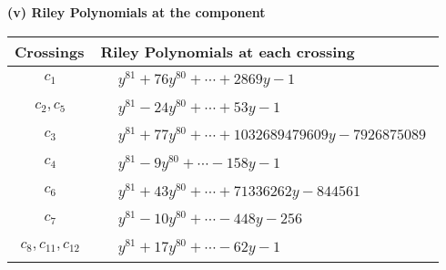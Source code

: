 \documentclass[1p]{elsarticle_modified}
\theoremstyle{definition}
\begin{document}
\newpage\renewcommand{\arraystretch}{1}
\flushleft \textbf{(v) Riley Polynomials at the component}\newline \\
\begin{tabular}{m{50pt}|m{274pt}}
Crossings & \hspace{64pt}Riley Polynomials at each crossing \\
\hline $$\begin{aligned}c_{1}\end{aligned}$$&$\begin{aligned}
&y^{81}+76 y^{80}+\cdots+2869 y-1
\end{aligned}$\\
\hline $$\begin{aligned}c_{2},c_{5}\end{aligned}$$&$\begin{aligned}
&y^{81}-24 y^{80}+\cdots+53 y-1
\end{aligned}$\\
\hline $$\begin{aligned}c_{3}\end{aligned}$$&$\begin{aligned}
&y^{81}+77 y^{80}+\cdots+1032689479609 y-7926875089
\end{aligned}$\\
\hline $$\begin{aligned}c_{4}\end{aligned}$$&$\begin{aligned}
&y^{81}-9 y^{80}+\cdots-158 y-1
\end{aligned}$\\
\hline $$\begin{aligned}c_{6}\end{aligned}$$&$\begin{aligned}
&y^{81}+43 y^{80}+\cdots+71336262 y-844561
\end{aligned}$\\
\hline $$\begin{aligned}c_{7}\end{aligned}$$&$\begin{aligned}
&y^{81}-10 y^{80}+\cdots-448 y-256
\end{aligned}$\\
\hline $$\begin{aligned}c_{8},c_{11},c_{12}\end{aligned}$$&$\begin{aligned}
&y^{81}+17 y^{80}+\cdots-62 y-1
\end{aligned}$\\

\end{tabular}
\end{document}
